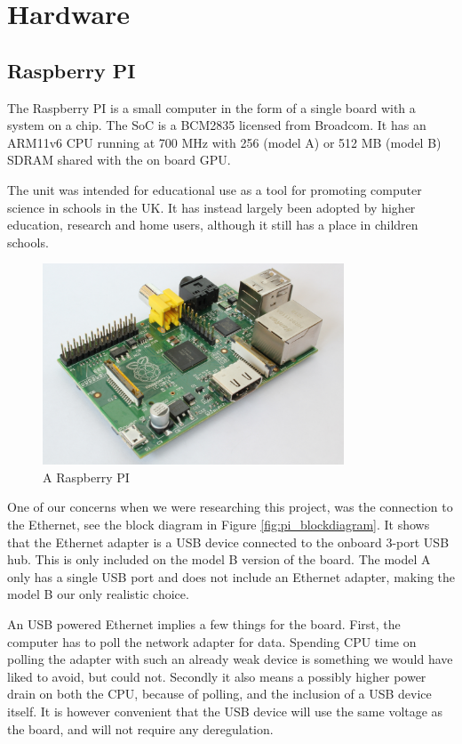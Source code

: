 \clearpage

\section{Hardware}
\label{sec:hardware}

\subsection{Raspberry PI}
The Raspberry PI is a small computer in the form of a single board with a system on a chip. The SoC is a BCM2835 licensed from Broadcom. It has an ARM11v6 CPU running at 700 MHz with 256 (model A) or 512 MB (model B) SDRAM shared with the on board GPU. 

The unit was intended for educational use as a tool for promoting computer science in schools in the UK. It has instead largely been adopted by higher education, research and home users, although it still has a place in children schools.

\begin{figure}[h]
    \centering
    \includegraphics[width=0.8\textwidth]{hardware/RaspberryPi}
    \caption{A Raspberry PI}
    \label{fig:raspberrypi_hw}
\end{figure}

One of our concerns when we were researching this project, was the connection to the Ethernet, see the block diagram in Figure \ref{fig:pi_blockdiagram}.
It shows that the Ethernet adapter is a USB device connected to the onboard 3-port USB hub. This is only included on the model B version of the board. 
The model A only has a single USB port and does not include an Ethernet adapter, making the model B our only realistic choice.

An USB powered Ethernet implies a few things for the board. First, the computer has to poll the network adapter for data. 
Spending CPU time on polling the adapter with such an already weak device is something we would have liked to avoid, but could not. Secondly it also means a possibly higher power drain on both the CPU, because of polling, and the inclusion of a USB device itself.
It is however convenient that the USB device will use the same voltage as the board, and will not require any deregulation. 

